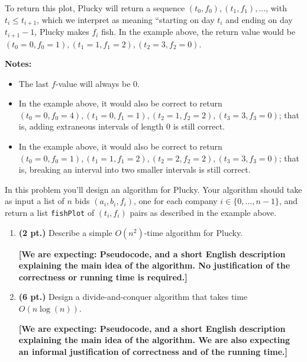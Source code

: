 \documentclass{article}
\newcommand{\expecting}[1]{\noindent\textbf{[We are expecting: #1]}}
\newcommand{\pts}[1]{\textbf{(#1 pt.)}}
\begin{document}
\begin{enumerate}
{{To return this plot, Plucky will return a sequence $(t_0, f_0), (t_1, f_1), \ldots$, with $t_i \leq t_{i+1}$, which we interpret as meaning ``starting on day $t_i$ and ending on day $t_{i+1} - 1$, Plucky makes $f_i$ fish.  In the example above, the return value would be $(t_0 =0, f_0 = 1), (t_1 = 1, f_1 = 2), (t_2 = 3, f_2 = 0)$.  

\vspace{.5cm}
\textbf{Notes:} 
\begin{itemize}
\item The last $f$-value will always be $0$.
\item In the example above, it would also be correct to return $(t_0 = 0, f_0 = 4), (t_1 = 0, f_1 = 1), (t_2 = 1, f_2 = 2), (t_3 = 3, f_3 = 0)$; that is, adding extraneous intervals of length $0$ is still correct.
\item In the example above, it would also be correct to return $(t_0 = 0, f_0 = 1), (t_1 = 1, f_1 = 2), (t_2 =2, f_2 = 2), (t_3 = 3, f_3 = 0)$; that is, breaking an interval into two smaller intervals is still correct.
\end{itemize}
}}


\vspace{1cm}
In this problem you'll design an algorithm for Plucky.   Your algorithm should take as input a list of $n$ bids $(a_i, b_i, f_i)$, one for each company $i \in \{0,\ldots,n-1\}$, and return a list \texttt{fishPlot} of $(t_i, f_i)$ pairs as described in the example above. 

\begin{enumerate}
	\item\pts{2} Describe a simple $O(n^2)$-time algorithm for Plucky.  

	\expecting{Pseudocode, and a short English description explaining the main idea of the algorithm.  No justification of the correctness or running time is required.}

	\item\pts{6} Design a divide-and-conquer algorithm that takes time $O(n \log(n) )$. 

	\expecting{Pseudocode, and a short English description explaining the main idea of the algorithm.  We are also expecting an informal justification of correctness and of the running time.}
\end{enumerate}

\end{enumerate}
\end{document}
